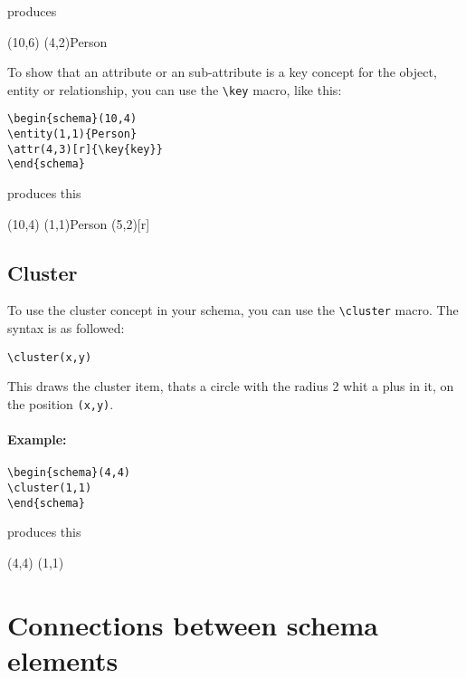 \documentclass[a4paper,11pt]{article}
\begin{document}
produces

\begin{schema}(10,6)
\entity(4,2){Person}
\end{schema}

To show that an attribute or an sub-attribute is a key concept for the object, entity or relationship,
you can use the \verb|\key| macro, like this:

\begin{verbatim}
\begin{schema}(10,4)
\entity(1,1){Person}
\attr(4,3)[r]{\key{key}}
\end{schema}
\end{verbatim}

produces this

\begin{schema}(10,4)
\entity(1,1){Person}
\attr(5,2)[r]{}
\end{schema}

\subsection{Cluster}

To use the cluster concept in your schema, you can use the \verb|\cluster| macro.
The syntax is as followed:

\begin{verbatim}
\cluster(x,y)
\end{verbatim}

This draws the cluster item, thats a circle with the radius 2 whit a plus in it, on the position 
{\tt (x,y)}.

\paragraph{Example:}

\begin{verbatim}
\begin{schema}(4,4)
\cluster(1,1)
\end{schema}

\end{verbatim}

produces this

\begin{schema}(4,4)
\cluster(1,1)
\end{schema}

\section{Connections between schema elements}
\end{document}
